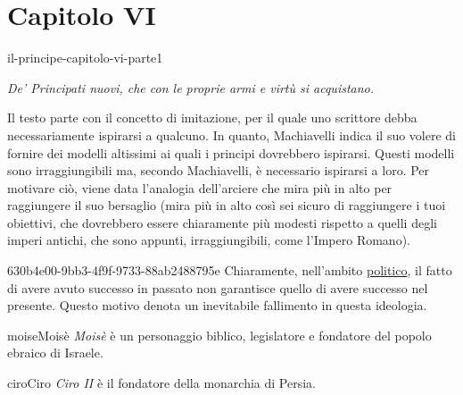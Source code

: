 \documentclass[preview]{standalone}
\begin{document}
\genpage

\section{Capitolo VI}

\begin{snippet}{il-principe-capitolo-vi-parte1}
    \begin{center}
        \begin{minipage}{0.75\textwidth}
            \itshape
            De' Principati nuovi, che con le proprie armi e virtù si acquistano. 
        \end{minipage}
    \end{center}
    \vspace{0.25cm}
    Il testo parte con il concetto di imitazione, per il quale uno scrittore
    debba necessariamente ispirarsi a qualcuno.
    In quanto, Machiavelli indica il suo volere di fornire dei modelli altissimi
    ai quali i principi dovrebbero ispirarsi.
    Questi modelli sono irraggiungibili ma, secondo Machiavelli, è necessario ispirarsi a loro.
    Per motivare ciò, viene data l'analogia dell'arciere che mira più in alto per raggiungere il suo bersaglio
    (mira più in alto così sei sicuro di raggiungere i tuoi obiettivi, che dovrebbero essere chiaramente
    più modesti rispetto a quelli degli imperi antichi, che sono appunti, irraggiungibili, come l'Impero Romano).
\end{snippet}

\begin{snippetnote}{630b4e00-9bb3-4f9f-9733-88ab2488795e}{}
    Chiaramente, nell'ambito \underline{politico}, il fatto di avere avuto successo in passato
    non garantisce quello di avere successo nel presente.
    Questo motivo denota un inevitabile fallimento in questa ideologia.
\end{snippetnote}


\begin{snippetcharacter}{moise}{Moisè}
    \textit{Moisè} è un personaggio biblico, legislatore e fondatore del popolo ebraico di Israele.
\end{snippetcharacter}

\begin{snippetcharacter}{ciro}{Ciro}
    \textit{Ciro II} è il fondatore della monarchia di Persia.
\end{snippetcharacter}
\end{document}
